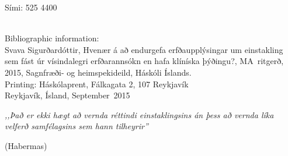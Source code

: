 \documentclass[a4paper,12pt,twoside,BCOR=10mm]{scrbook}
\def\thesisyear{2015}       						%
\def\thesismonth{September}						%
\def\thesisauthor{Svava Sigurðardóttir}					%
\def\thesistitle{Hvenær á að endurgefa erfðaupplýsingar um einstakling sem fást úr vísindalegri erfðarannsókn en hafa klíníska þýðingu?} 						%
\def\thesiskind{MA}							%
\def\thesisfaculty{Sagnfræði- og heimspekideild}	%
\def\thesistelephone{525 4400}						%
\def\thesisPrinting{Háskólaprent, Fálkagata 2, 107 Reykjavík}
\begin{document}
\begin{titlepage}
Sími: \thesistelephone \\ \\
\vspace*{\lineskip}

Bibliographic information: \\
\thesisauthor, \thesistitle, \thesiskind~ritgerð, \thesisyear, \thesisfaculty, Háskóli Íslands. \\


Printing: \thesisPrinting \\
Reykjavík, Ísland, \thesismonth~\thesisyear \\
\newpage
\thispagestyle{empty} \mbox{}
\vfill
\begin{center}
\textit{,,Það er ekki hægt að vernda réttindi einstaklingsins án þess að vernda líka velferð samfélagsins sem hann tilheyrir''}
\end{center}
\begin{flushright}
\small{(Habermas)}
\end{flushright}
\vfill 

\thispagestyle{empty}
\cleardoublepage
\end{titlepage}


\setcounter{page}{7}
\end{document}

